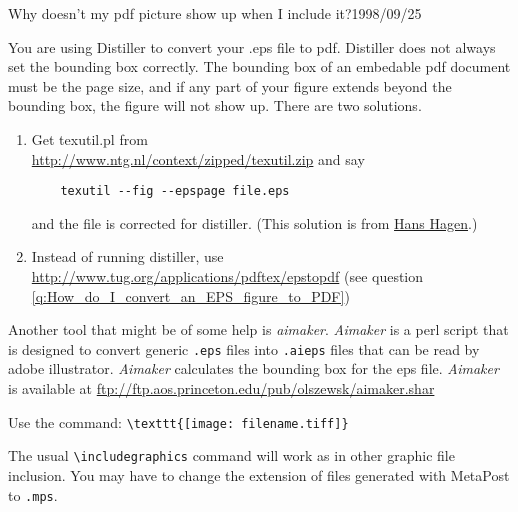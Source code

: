 \documentclass{article}
\begin{document}
  {Why doesn't my pdf picture show up when I include it?}{1998/09/25}

  You are using Distiller to convert your .eps file to pdf.  Distiller
  does not always set the bounding box correctly. The bounding box of
  an embedable pdf document must be the page size, and if any part of
  your figure extends beyond the bounding box, the figure will not
  show up.  There are two solutions.

  \begin{enumerate}
    \item Get texutil.pl from\\
        \url{http://www.ntg.nl/context/zipped/texutil.zip} and say
        \begin{verbatim}
    texutil --fig --epspage file.eps
        \end{verbatim}
        and the file is corrected for distiller. (This solution is
        from \href{mailto:pragma@wxs.nl}{Hans Hagen}.)\par
    \item Instead of running distiller, use\\
        \url{http://www.tug.org/applications/pdftex/epstopdf} (see
question \ref{q:How_do_I_convert_an_EPS_figure_to_PDF})
\end{enumerate}

  Another tool that might be of some help is \textit{aimaker}.
  \textit{Aimaker} is a perl script that is designed to convert
  generic \verb+.eps+ files into \verb+.aieps+
  files that can be read by adobe   illustrator.
  \textit{Aimaker} calculates the bounding box for the
  eps file. \textit{Aimaker} is available at
  \url{ftp://ftp.aos.princeton.edu/pub/olszewsk/aimaker.shar}




Use the command: \verb+\texttt{[image: filename.tiff]}+



The usual \verb+\includegraphics+ command will work as in other
graphic file inclusion. You may have to change the extension of files
generated with MetaPost to \texttt{.mps}.
\end{document}
